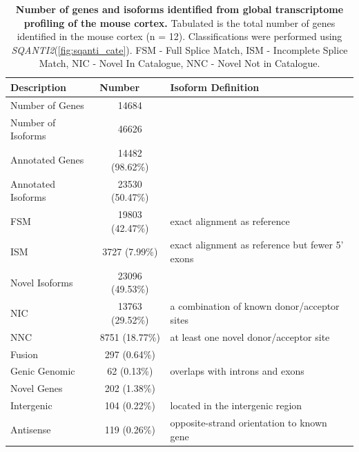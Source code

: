 \vspace{0.7cm}
\begin{table}[!h]
	\caption[Number of genes and isoforms identified from global transcriptome profiling of the mouse cortex]%
	{\textbf{Number of genes and isoforms identified from global transcriptome profiling of the mouse cortex.} Tabulated is the total number of genes identified in the mouse cortex (n = 12). Classifications were performed using \textit{SQANTI2}(\cref{fig:sqanti_cate}). FSM - Full Splice Match, ISM - Incomplete Splice Match, NIC - Novel In Catalogue, NNC - Novel Not in Catalogue. }
	\label{tab:sqanti_output_whole}
	\begin{tabularx}{1\textwidth}{lcl}
		\toprule
		Description              & \multicolumn{1}{l}{Number} & Isoform Definition               \\ \midrule
		Number of Genes    & 14684                      &                                  \\
		Number of Isoforms & 46626                      &                                  \\
		Annotated Genes          & 14482 (98.62\%)            &                                  \\
		\hspace{3mm}Annotated Isoforms       & 23530 (50.47\%)            &                                  \\
		\hspace{6mm}FSM          & 19803 (42.47\%) & exact alignment as reference  \\
		\hspace{6mm}ISM  & 3727 (7.99\%)   & exact alignment as reference but fewer 5’ exons       \\
		\hspace{3mm}Novel Isoforms           & 23096 (49.53\%)            &                                  \\
		\hspace{6mm}NIC      & 13763 (29.52\%) & a combination of known donor/acceptor sites                    \\
		\hspace{6mm}NNC   & 8751 (18.77\%)  & at least one novel donor/acceptor site    \\
		\hspace{6mm}Fusion                   & 297 (0.64\%)               &                                  \\
		\hspace{6mm}Genic Genomic            & 62 (0.13\%)                & overlaps with introns and exons  \\
		Novel Genes              & 202 (1.38\%)               &                                  \\
		\hspace{6mm}Intergenic               & 104 (0.22\%)               & located in the intergenic region \\
		\hspace{6mm}Antisense                     & 119 (0.26\%)    & opposite-strand orientation to known gene           \\ \bottomrule
	\end{tabularx}
\end{table}

